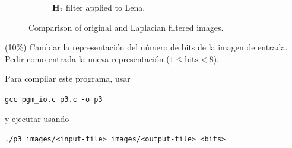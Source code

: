 \documentclass{article}
\theoremstyle{problemstyle}
\begin{document}
\begin{problem}
\begin{enumerate}[a)]
\begin{figure}[H]
\begin{subfigure}{.45\textwidth}
			      \caption{$ \mathbf{H}_2 $ filter applied to Lena.}
			      \label{fig:lena_laplacian20}
		      \end{subfigure}
		      \caption{Comparison of original and Laplacian filtered images.}
	      \end{figure}
\end{enumerate}
\end{problem}

\begin{problem}
(10\%) Cambiar la representaci\'on del n\'umero de bits de la imagen de entrada. Pedir como entrada la nueva representaci\'on ($ 1\leq \text{bits}< 8 $).

Para compilar este programa, usar

\texttt{gcc pgm\_io.c p3.c -o p3} 

y ejecutar usando 

\texttt{./p3 images/<input-file> images/<output-file> <bits>}.


\end{problem}
\end{document}
